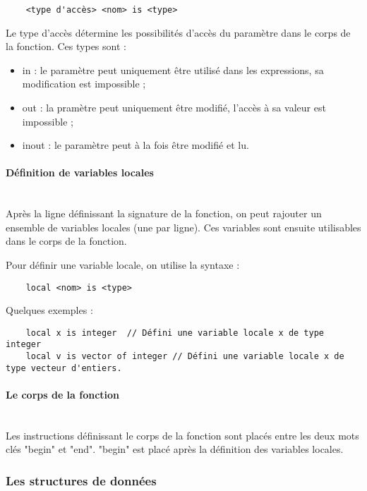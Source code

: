\begin{verbatim}
    <type d'accès> <nom> is <type>
\end{verbatim}

Le type d'accès détermine les possibilités d'accès du paramètre dans le corps
de la fonction. Ces types sont :
\begin{itemize}
    \item in : le paramètre peut uniquement être utilisé dans les expressions,
          sa modification est impossible ;
    \item out : la pramètre peut uniquement être modifié, l'accès à sa
          valeur est impossible ;
    \item inout : le paramètre peut à la fois être modifié et lu.
\end{itemize}


\paragraph{Définition de variables locales}\mbox{} \\

Après la ligne définissant la signature de la fonction, on peut rajouter un
ensemble de variables locales (une par ligne). Ces variables sont ensuite
utilisables dans le corps de la fonction.

Pour définir une variable locale, on utilise la syntaxe :
\begin{verbatim}
    local <nom> is <type>
\end{verbatim}

Quelques exemples :
\begin{verbatim}
    local x is integer  // Défini une variable locale x de type integer
    local v is vector of integer // Défini une variable locale x de type vecteur d'entiers.
\end{verbatim}

\paragraph{Le corps de la fonction}\mbox{} \\

Les instructions définissant le corps de la fonction sont placés entre les deux
mots clés "begin" et "end". "begin" est placé après la définition des
variables locales.


\subsubsection{Les structures de données}

